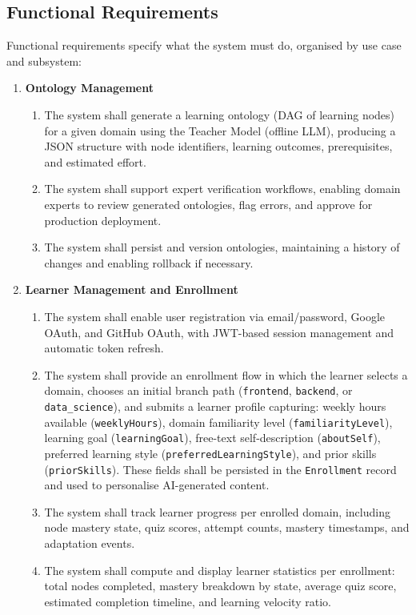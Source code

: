 \subsection*{Functional Requirements}

Functional requirements specify what the system must do, organised by use case and subsystem:

\begin{enumerate}
    \item[\textbf{FR1:}] \textbf{Ontology Management}
        \begin{enumerate}
            \item[\textbf{FR1.1:}] The system shall generate a learning ontology (DAG of learning nodes) for a given domain using the Teacher Model (offline LLM), producing a JSON structure with node identifiers, learning outcomes, prerequisites, and estimated effort.
            \item[\textbf{FR1.2:}] The system shall support expert verification workflows, enabling domain experts to review generated ontologies, flag errors, and approve for production deployment.
            \item[\textbf{FR1.3:}] The system shall persist and version ontologies, maintaining a history of changes and enabling rollback if necessary.
        \end{enumerate}

    \item[\textbf{FR2:}] \textbf{Learner Management and Enrollment}
        \begin{enumerate}
            \item[\textbf{FR2.1:}] The system shall enable user registration via email/password, Google OAuth, and GitHub OAuth, with JWT-based session management and automatic token refresh.
            \item[\textbf{FR2.2:}] The system shall provide an enrollment flow in which the learner selects a domain, chooses an initial branch path (\texttt{frontend}, \texttt{backend}, or \texttt{data\_science}), and submits a learner profile capturing: weekly hours available (\texttt{weeklyHours}), domain familiarity level (\texttt{familiarityLevel}), learning goal (\texttt{learningGoal}), free-text self-description (\texttt{aboutSelf}), preferred learning style (\texttt{preferredLearningStyle}), and prior skills (\texttt{priorSkills}). These fields shall be persisted in the \texttt{Enrollment} record and used to personalise AI-generated content.
            \item[\textbf{FR2.3:}] The system shall track learner progress per enrolled domain, including node mastery state, quiz scores, attempt counts, mastery timestamps, and adaptation events.
            \item[\textbf{FR2.4:}] The system shall compute and display learner statistics per enrollment: total nodes completed, mastery breakdown by state, average quiz score, estimated completion timeline, and learning velocity ratio.
        \end{enumerate}


\end{enumerate}
